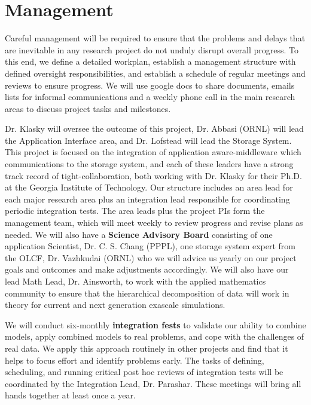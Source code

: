 \section*{Management}
\label{sec:management}

Careful management will be required to ensure that the problems and delays that are inevitable in any research project
do not unduly disrupt overall progress. To this end, we define a detailed workplan,
establish a  management structure with defined oversight responsibilities, and establish a schedule of regular meetings and
reviews to ensure progress.  We will use google docs to share documents, emails lists for informal communications and a 
weekly phone call in the main research areas to discuss project tasks and milestones. 

Dr. Klasky will oversee the outcome of this project,  Dr. Abbasi (ORNL) will lead the Application Interface area, and Dr. Lofstead
will lead the Storage System. This project is focused on the integration of application aware-middleware which communications to the storage system,
and each of these leaders have a strong track record of tight-collaboration, both working with Dr. Klasky for their Ph.D. at the Georgia
Institute of Technology.  Our structure includes an area lead for each major research area plus
an integration lead responsible for coordinating periodic integration tests. The area leads plus the project PIs
form the management team, which will meet weekly to review progress and revise plans as needed.
We will also have a {\bf Science Advisory Board} consisting of one application Scientist, Dr. C. S. Chang (PPPL), one storage system expert from the 
OLCF, Dr. Vazhkudai (ORNL) who we will advice us yearly on our project goals and outcomes and make adjustments accordingly. We will also have our
lead Math Lead, Dr. Ainsworth, to work with the applied mathematics community to ensure that the hierarchical decomposition of data will work in theory
for current and next generation exascale simulations. 

We will conduct six-monthly {\bf integration fests}  to validate our ability to combine models, apply
combined models to real problems, and cope with the challenges of real data. We apply this approach routinely
in other projects and find that it helps to focus effort and identify problems early. The tasks of defining,
scheduling, and running critical post hoc reviews of integration tests will be coordinated by the Integration Lead, Dr. Parashar. 
These meetings will bring all hands together at least once a year.

